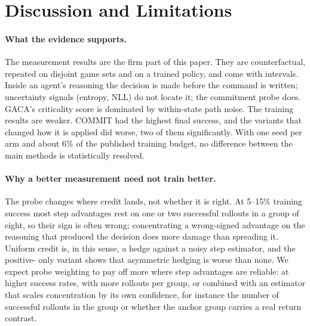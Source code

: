 \section{Discussion and Limitations}
\label{sec:discussion}

\paragraph{What the evidence supports.}
The measurement results are the firm part of this paper. They are counterfactual, repeated on disjoint
game sets and on a trained policy, and come with intervals. Inside an agent's reasoning the decision is
made before the command is written; uncertainty signals (entropy, NLL) do not locate it; the commitment
probe does. GACA's criticality score is dominated by within-state path noise. The training results are
weaker. COMMIT had the highest final success, and the variants that changed how it is
applied did worse, two of them significantly. With one seed per arm and about 6\% of the published
training budget, no difference between the main methods is statistically resolved.

\paragraph{Why a better measurement need not train better.}
The probe changes where credit lands, not whether it is right. At 5--15\% training success most step
advantages rest on one or two successful rollouts in a group of eight, so their sign is often wrong;
concentrating a wrong-signed advantage on the reasoning that produced the decision does more damage than
spreading it. Uniform credit is, in this sense, a hedge against a noisy step estimator, and the positive-
only variant shows that asymmetric hedging is worse than none. We expect probe weighting to pay off more
where step advantages are reliable: at higher success rates, with more rollouts per group, or combined
with an estimator that scales concentration by its own confidence, for instance the number of successful
rollouts in the group or whether the anchor group carries a real return contrast.

